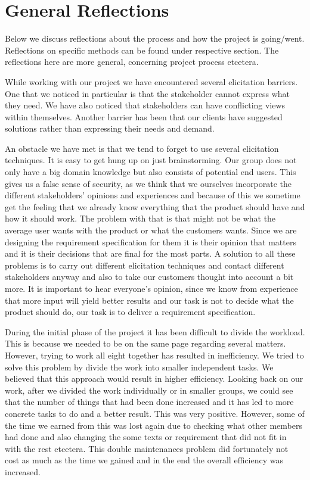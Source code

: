 \documentclass[a4paper]{article}
\begin{document}
	\section{General Reflections}

	Below we discuss reflections about the process and how the project is going/went. Reflections on specific methods can be found under respective section. The reflections here are more general, concerning project process etcetera.

While working with our project we have encountered several elicitation barriers. One that we noticed in particular is that the stakeholder cannot express what they need. We have also noticed that stakeholders can have conflicting views within themselves. Another barrier has been that our clients have suggested solutions rather than expressing their needs and demand.

An obstacle we have met is that we tend to forget to use several elicitation techniques. It is easy to get hung up on just brainstorming. Our group does not only have a big domain knowledge but also consists of potential end users. This gives us a false sense of security, as we think that we ourselves incorporate the different stakeholders' opinions and experiences and because of this we sometime get the feeling that we already know everything that the product should have and how it should work. The problem with that is that might not be what the average user wants with the product or what the customers wants. Since we are designing the requirement specification for them it is their opinion that matters and it is their decisions that are final for the most parts. A solution to all these problems is to carry out different elicitation techniques and contact different stakeholders anyway and also to take our customers thought into account a bit more. It is important to hear everyone's opinion, since we know from experience that more input will yield better results and our task is not to decide what the product should do, our task is to deliver a requirement specification.

During the initial phase of the project it has been difficult to divide the workload. This is because we needed to be on the same page regarding several matters. However, trying to work all eight together has resulted in inefficiency. We tried to solve this problem by divide the work into smaller independent tasks. We believed that this approach would result in higher efficiency. Looking back on our work, after we divided the work individually or in smaller groups, we could see that the number of things that had been done increased and it has led to more concrete tasks to do and a better result. This was very positive. However, some of the time we earned from this was lost again due to checking what other members had done and also changing the some texts or requirement that did not fit in with the rest etcetera. This double maintenances problem did fortunately not cost as much as the time we gained and in the end the overall efficiency was increased.
\end{document}
